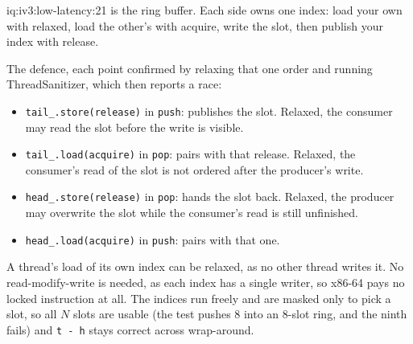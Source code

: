 \begin{solution}{iq:iv3:low-latency:21}
 is the ring buffer. Each side owns one index: load your own with relaxed, load the other's with acquire, write the slot, then publish your index with release.
\label{lst:iv3:ll:spsc}

The defence, each point confirmed by relaxing that one order and running ThreadSanitizer, which then reports a race:
\begin{itemize}
\item \texttt{tail\_.store(release)} in \texttt{push}: publishes the slot. Relaxed, the consumer may read the slot before the write is visible.
\item \texttt{tail\_.load(acquire)} in \texttt{pop}: pairs with that release. Relaxed, the consumer's read of the slot is not ordered after the producer's write.
\item \texttt{head\_.store(release)} in \texttt{pop}: hands the slot back. Relaxed, the producer may overwrite the slot while the consumer's read is still unfinished.
\item \texttt{head\_.load(acquire)} in \texttt{push}: pairs with that one.
\end{itemize}
A thread's load of its own index can be relaxed, as no other thread writes it. No read-modify-write is needed, as each index has a single writer, so x86-64 pays no locked instruction at all. The indices run freely and are masked only to pick a slot, so all $N$ slots are usable (the test pushes 8 into an 8-slot ring, and the ninth fails) and \texttt{t - h} stays correct across wrap-around.

\end{solution}

